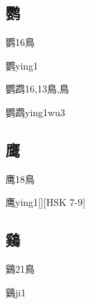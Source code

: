 \subsection*{鹦}

\begin{Entry}{鹦}{16}{⿃}
  \begin{Phonetics}{鹦}{ying1}
  \end{Phonetics}
\end{Entry}

\begin{Entry}{鹦鹉}{16,13}{⿃,⿃}
  \begin{Phonetics}{鹦鹉}{ying1wu3}
  \end{Phonetics}
\end{Entry}

\subsection*{鹰}

\begin{Entry}{鹰}{18}{⿃}
  \begin{Phonetics}{鹰}{ying1}[][HSK 7-9]
  \end{Phonetics}
\end{Entry}

\subsection*{鷄}

\begin{Entry}{鷄}{21}{⿃}
  \begin{Phonetics}{鷄}{ji1}
  \end{Phonetics}
\end{Entry}


